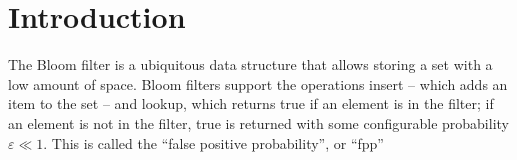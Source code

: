 \documentclass[letterpaper,twocolumn,10pt]{article}
\begin{document}



\section{Introduction}






The Bloom filter is a ubiquitous data structure that allows storing a set with a low amount of space.
Bloom filters support the operations insert -- which adds an item to the set -- and lookup, which returns true if an element is in the filter; if an element is not in the filter, true is returned with some configurable probability $\varepsilon \ll 1$.
This is called the ``false positive probability'', or ``fpp''
\end{document}
